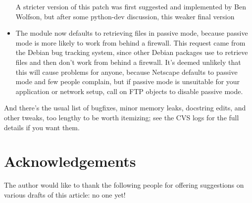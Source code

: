 \documentclass{howto}
\begin{document}
\begin{itemize}
A stricter version of this patch was first suggested and implemented
by Ben Wolfson, but after some python-dev discussion, this weaker final version 

\item The  module now defaults to retrieving files in passive mode,
because passive mode is more likely to work from behind a firewall.
This request came from the Debian bug tracking system, since other
Debian packages use  to retrieve files and then don't
work from behind a firewall.  It's deemed unlikely that this will
cause problems for anyone, because Netscape defaults to passive mode
and few people complain, but if passive mode is unsuitable for your
application or network setup, call
 on FTP objects to disable passive mode.  

\end{itemize}

And there's the usual list of bugfixes, minor memory leaks, docstring
edits, and other tweaks, too lengthy to be worth itemizing; see the
CVS logs for the full details if you want them.


\section{Acknowledgements}

The author would like to thank the following people for offering
suggestions on various drafts of this article: no one yet!
\end{document}
